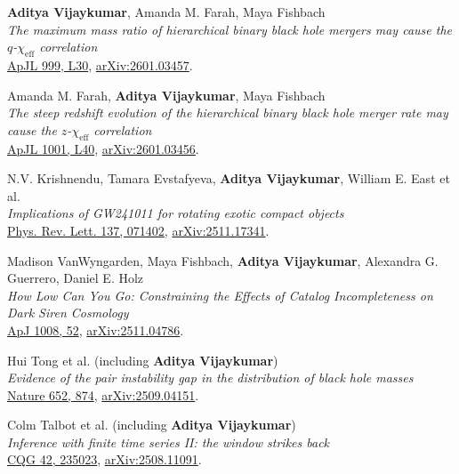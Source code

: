 \begin{etaremune}
        \item \textbf{Aditya Vijaykumar}, Amanda M. Farah, Maya Fishbach \\
        \textit{The maximum mass ratio of hierarchical binary black hole mergers may cause the $q$-$\chi_{\mathrm{eff}}$ correlation}\\
        \href{https://doi.org/10.3847/2041-8213/ae4878}{ApJL 999, L30}, \href{https://arxiv.org/abs/2601.03457}{arXiv:2601.03457}.


        \item Amanda M. Farah, \textbf{Aditya Vijaykumar}, Maya Fishbach \\
        \textit{The steep redshift evolution of the hierarchical binary black hole merger rate may cause the $z$-$\chi_{\mathrm{eff}}$ correlation}\\
        \href{https://doi.org/10.3847/2041-8213/ae4e19}{ApJL 1001, L40}, \href{https://arxiv.org/abs/2601.03456}{arXiv:2601.03456}.

        \item N.V. Krishnendu, Tamara Evstafyeva, \primary\textbf{Aditya Vijaykumar}, William E. East et al. \\
        \textit{Implications of GW241011 for rotating exotic compact objects}\\
        \href{https://doi.org/10.1103/29y5-nx9y}{Phys. Rev. Lett. 137, 071402}, \href{https://arxiv.org/abs/2511.17341}{arXiv:2511.17341}.

        \item Madison VanWyngarden, Maya Fishbach, \textbf{Aditya Vijaykumar}, Alexandra G. Guerrero, Daniel E. Holz \\
        \textit{How Low Can You Go: Constraining the Effects of Catalog Incompleteness on Dark Siren Cosmology}\\
        \href{https://doi.org/10.3847/1538-4357/ae8c3d}{ApJ 1008, 52}, \href{https://arxiv.org/abs/2511.04786}{arXiv:2511.04786}.

        \item Hui Tong et al. (including \textbf{Aditya Vijaykumar}) \\
        \textit{Evidence of the pair instability gap in the distribution of black hole masses}\\
        \href{https://doi.org/10.1038/s41586-026-10359-0}{Nature 652, 874}, \href{https://arxiv.org/abs/2509.04151}{arXiv:2509.04151}.

        \item Colm Talbot et al. (including \textbf{Aditya Vijaykumar}) \\
        \textit{Inference with finite time series II: the window strikes back}\\
        \href{https://doi.org/10.1088/1361-6382/ae1ac7}{CQG 42, 235023}, \href{https://arxiv.org/abs/2508.11091}{arXiv:2508.11091}.


\end{etaremune}
